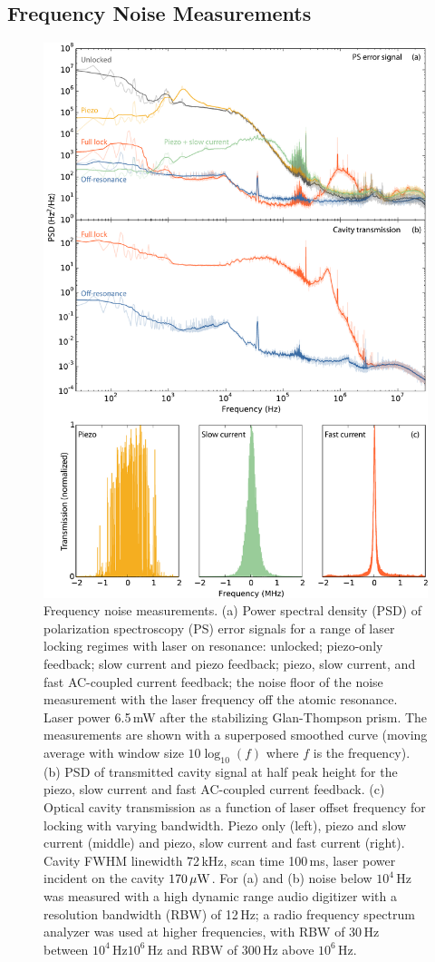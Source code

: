 \documentclass[10pt,letterpaper]{article}
\begin{document}
\subsection{Frequency Noise Measurements}

\begin{figure}[htbp]
\centering
    \includegraphics[width=0.9\linewidth]{scholten_fig3.pdf}
\caption{Frequency noise measurements.
(a) Power spectral density (PSD) of polarization spectroscopy (PS) error signals for a range of laser locking regimes with laser on resonance: unlocked; piezo-only feedback; slow current and piezo feedback; piezo, slow current, and fast AC-coupled current feedback; the noise floor of the noise measurement with the laser frequency off the atomic resonance.
Laser power 6.5\,mW after the stabilizing Glan-Thompson prism.
The measurements are shown with a superposed smoothed curve (moving average  with window size $10\log_{10}(f)$ where $f$ is the frequency).
(b) PSD of transmitted cavity signal at half peak height for the piezo, slow current and fast AC-coupled current feedback.
(c) Optical cavity transmission as a function of laser offset frequency for locking with varying bandwidth.
Piezo only (left), piezo and slow current (middle) and piezo, slow current and fast current (right).
Cavity FWHM linewidth 72\,kHz, scan time 100\,ms, laser power incident on the cavity $170\rm\,\mu W$.
For (a) and (b) noise below $10^4$\,Hz was measured with a high dynamic range audio digitizer with a resolution bandwidth (RBW) of 12\,Hz; a radio frequency spectrum analyzer was used at higher frequencies, with RBW of 30\,Hz between $10^4$\,Hz\textendash$10^6$\,Hz and RBW of 300\,Hz above $10^6$\,Hz.\label{fig:PSDs}\label{fig:cavity_scans}}
\end{figure}
\end{document}
